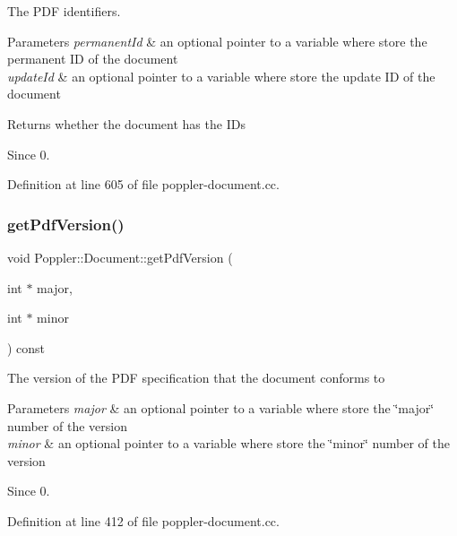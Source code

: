The P\+DF identifiers.


\begin{DoxyParams}{Parameters}
{\em permanent\+Id} & an optional pointer to a variable where store the permanent ID of the document \\
\hline
{\em update\+Id} & an optional pointer to a variable where store the update ID of the document\\
\hline
\end{DoxyParams}
\begin{DoxyReturn}{Returns}
whether the document has the I\+Ds
\end{DoxyReturn}
\begin{DoxySince}{Since}
0. 
\end{DoxySince}


Definition at line 605 of file poppler-\/document.\+cc.

\mbox{\label{class_poppler_1_1_document_a1edbfdfd0b5adf4be650c2636a309181}} 
\subsubsection{\texorpdfstring{get\+Pdf\+Version()}{getPdfVersion()}}
{\footnotesize\ttfamily void Poppler\+::\+Document\+::get\+Pdf\+Version (\begin{DoxyParamCaption}\item[{int $\ast$}]{major,  }\item[{int $\ast$}]{minor }\end{DoxyParamCaption}) const}

The version of the P\+DF specification that the document conforms to


\begin{DoxyParams}{Parameters}
{\em major} & an optional pointer to a variable where store the \char`\"{}major\char`\"{} number of the version \\
\hline
{\em minor} & an optional pointer to a variable where store the \char`\"{}minor\char`\"{} number of the version\\
\hline
\end{DoxyParams}
\begin{DoxySince}{Since}
0. 
\end{DoxySince}


Definition at line 412 of file poppler-\/document.\+cc.

